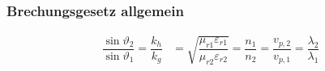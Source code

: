 \subsubsection{Brechungsgesetz allgemein}
\begin{align*}
    \dfrac{\sin \vartheta_{2}}{\sin \vartheta_{1}} = \dfrac{k_{h}}{k_{g}} & = \sqrt{\dfrac{\mu_{r 1} \varepsilon_{r 1}}{\mu_{r 2} \varepsilon_{r 2}}} = \dfrac{n_{1}}{n_{2}} = \dfrac{v_{p, 2}}{v_{p, 1}} = \dfrac{\lambda_{2}}{\lambda_{1}} \\
\end{align*}




\
